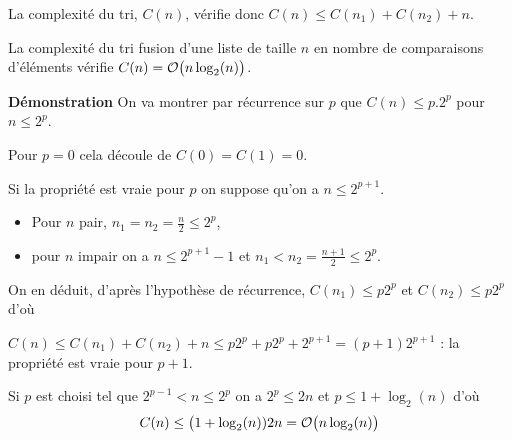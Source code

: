 La complexité du tri, $C(n)$, vérifie donc $C(n) \le C(n_1) + C(n_2) +n$.
\begin{thm} 
La complexité du tri fusion d'une liste de taille $n$ en nombre de comparaisons d'éléments vérifie
$C(n) ={\cal O}\bigl(n\log_2(n)\bigr)$.
\end{thm}
{\bf Démonstration} On va montrer par récurrence sur $p$ que $C(n)\le p.2^p$ pour $n \le 2^p$.

Pour $p=0$ cela découle de $C(0)=C(1)=0$.

Si la propriété est vraie pour $p$ on suppose qu'on a $n\le 2^{p+1}$.
\begin{itemize}
    \item Pour $n$ pair, $n_1=n_2 = \frac n2\le 2^p$,
    \item pour $n$ impair on a $n\le 2^{p+1}-1$ et $n_1< n_2 = \frac{n+1}2\le 2^p$.
\end{itemize}

On en déduit, d'après l'hypothèse de récurrence, $C(n_1)\le p2^p$ et $C(n_2)\le p2^p$ d'où

$C(n) \le C(n_1) + C(n_2) +n \le p2^p+p2^p+2^{p+1} = (p+1)2^{p+1}$ : la propriété est vraie pour $p+1$.

\medskip

Si $p$ est choisi tel que $2^{p-1} < n \le 2^p$ on a $2^p\le 2n$ et $p \le 1+\log_2(n)$ d'où
\[C(n) \le \bigl(1+\log_2(n))2n={\cal O}\bigl(n\log_2(n)\bigr)\]

